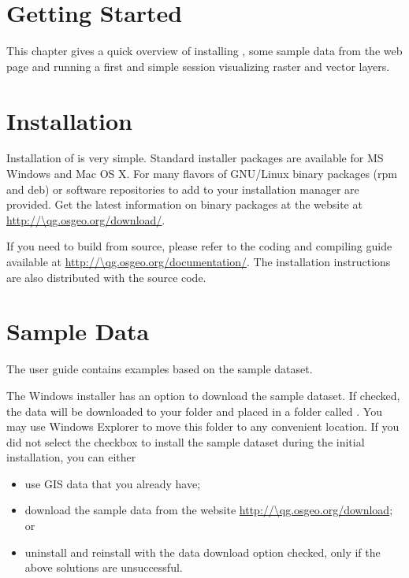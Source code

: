 
\section{Getting Started}\label{label_getstarted}


This chapter gives a quick overview of installing \qg, some sample 
data from the \qg web page and running a first and simple session 
visualizing raster and vector layers.

\section{Installation}\label{label_installation}

Installation of \qg is very simple. Standard installer packages are
available for MS Windows and Mac OS X. For many flavors of GNU/Linux binary
packages (rpm and deb) or software repositories to add to your installation
manager are provided. Get the latest information on binary packages at the
\qg website at \url{http://\qg.osgeo.org/download/}.


If you need to build \qg from source, please refer to the coding and
compiling guide available at \url{http://\qg.osgeo.org/documentation/}. 
The installation instructions are also distributed with the \qg source
code.

\section{Sample Data}\label{label_sampledata}

The user guide contains examples based on the \qg sample dataset. 

\win The Windows installer has an option to download the \qg sample dataset.
If checked, the data will be downloaded to your 
folder and placed in a folder called . 
You may use Windows Explorer to move this folder to any convenient location.
If you did not select the checkbox to install the sample dataset
during the initial \qg installation, you can either
\begin{itemize}[label=--]
\item use GIS data that you already have;
\item download the sample data from the \qg website
 \url{http://\qg.osgeo.org/download}; or
\item uninstall \qg and reinstall with the data download option checked, only if 
the above solutions are unsuccessful.
\end{itemize}

